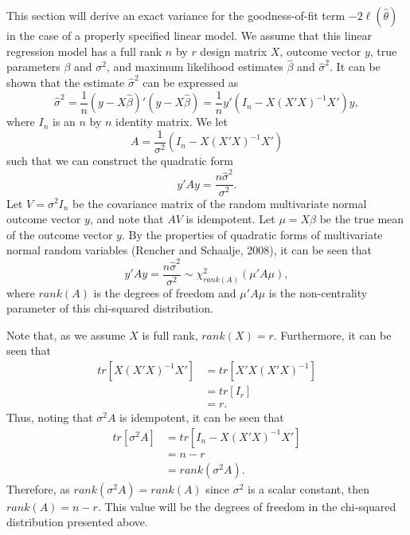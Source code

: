 This section will derive an exact variance for the goodness-of-fit term $-2 \ell (\hat{\theta} )$ in the case of a properly specified
linear model. We assume that this linear regression model has a full rank $n$ by $r$ design matrix $X$, outcome vector $y$, true parameters $\beta$ and $\sigma^2$,
and maximum likelihood estimates $\hat{\beta}$ and $\hat{\sigma}^2$. It can be shown that the estimate $\hat{\sigma}^2$ can be expressed as
\begin{equation*}
	\hat{\sigma}^2 =  \frac{1}{n} (y-X\hat{\beta})'(y-X\hat{\beta}) = \frac{1}{n} y'(I_n - X(X'X)^{-1}X')y ,
\end{equation*}
where $I_n$ is an $n$ by $n$ identity matrix. We let
\begin{equation*}
	A = \frac{1}{\sigma^2} (I_n - X(X'X)^{-1}X') 
\end{equation*}
such that we can construct the quadratic form
\begin{equation*}
	y'Ay = \frac{n \hat{\sigma}^2}{\sigma^2} .
\end{equation*}
Let $V = \sigma^2 I_n$ be the covariance matrix of the random multivariate normal outcome vector $y$, and note that $AV$ is idempotent. Let $\mu = X \beta$ be the
true mean of the outcome vector $y$. By the properties of quadratic forms of multivariate normal random variables (Rencher and Schaalje, 2008), it can be seen that
\begin{equation*}
	y'Ay = \frac{n \hat{\sigma}^2}{\sigma^2} \sim \chi^2_{rank \left( A \right) } (\mu 'A\mu) ,
\end{equation*}
where $rank \left( A \right)$ is the degrees of freedom and $\mu 'A \mu$ is the non-centrality parameter of this chi-squared distribution.

Note that, as we assume $X$ is full rank, $rank(X) = r$. Furthermore, it can be seen that
\begin{equation*}
	\begin{split}
	tr\left[ X(X'X)^{-1}X' \right] & = tr \left[ X'X(X'X)^{-1} \right]  \\ 
	& = tr \left[ I_r \right] \\
	& = r .
	\end{split}
\end{equation*}
Thus, noting that $\sigma^2 A$ is idempotent, it can be seen that
\begin{equation*}
	\begin{split}
	tr \left[ \sigma^2 A \right] & = tr \left[ I_n - X(X'X)^{-1}X' \right]  \\ 
	& = n-r \\
	& = rank \left( \sigma^2 A \right) .
	\end{split}
\end{equation*}
Therefore, as $rank \left( \sigma^2 A \right) = rank \left( A \right)$ since $\sigma^2$ is a scalar constant, then $rank \left( A \right) = n-r$. This value will be the degrees of
freedom in the chi-squared distribution presented above.


